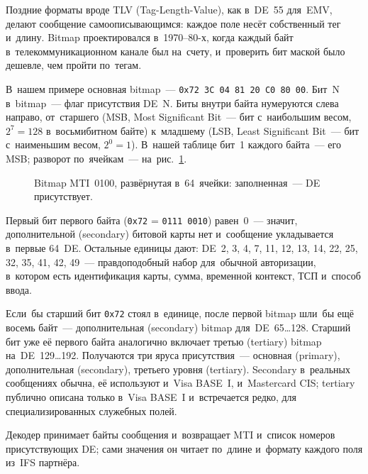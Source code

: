 Поздние форматы вроде TLV (Tag-Length-Value), как в~DE~55 для~EMV,
делают сообщение самоописывающимся: каждое поле несёт
собственный тег и~длину. Bitmap проектировался в~1970--80-х, когда каждый байт
в~телекоммуникационном канале был на~счету, и~проверить бит маской было дешевле,
чем пройти по~тегам.

В~нашем примере основная bitmap~--- \texttt{0x72 3C 04 81 20 C0 80 00}.
Бит~N в~bitmap~--- флаг присутствия DE~N. Биты внутри байта нумеруются слева направо,
от~старшего (MSB, Most Significant Bit~--- бит с~наибольшим весом, $2^7 = 128$
в~восьмибитном байте) к~младшему (LSB, Least Significant Bit~--- бит
с~наименьшим весом, $2^0 = 1$). В~нашей таблице бит~1 каждого байта~--- его
MSB; разворот по~ячейкам~--- на~рис.~\ref{fig:bitmap-presence}.

\begin{figure}[tbp]
  \centering
  \caption{Bitmap MTI~0100, развёрнутая в~64~ячейки: заполненная~--- DE присутствует.}\label{fig:bitmap-presence}
\end{figure}

Первый бит первого байта (\texttt{0x72} = \texttt{0111\,0010}) равен~0~---
значит, дополнительной (secondary) битовой карты нет и~сообщение укладывается
в~первые 64~DE. Остальные единицы дают: DE~2, 3, 4, 7, 11, 12, 13, 14, 22, 25,
32, 35, 41, 42, 49~--- правдоподобный набор для~обычной авторизации, в~котором
есть идентификация карты, сумма, временной контекст, ТСП и~способ ввода.

Если~бы старший бит \texttt{0x72} стоял в~единице, после первой bitmap шли~бы ещё
восемь байт~--- дополнительная (secondary) bitmap для~DE~65\dots128. Старший
бит уже её первого байта аналогично включает третью (tertiary) bitmap
на~DE~129\dots192. Получаются три яруса присутствия~--- основная (primary),
дополнительная (secondary), третьего уровня (tertiary). Secondary в~реальных
сообщениях обычна, её используют и~Visa BASE~I, и~Mastercard CIS; tertiary
публично описана только в~Visa BASE~I и~встречается редко, для
специализированных служебных полей.

Декодер принимает байты сообщения и~возвращает MTI и~список номеров
присутствующих DE; сами значения он читает по~длине и~формату каждого поля
из~IFS партнёра.



